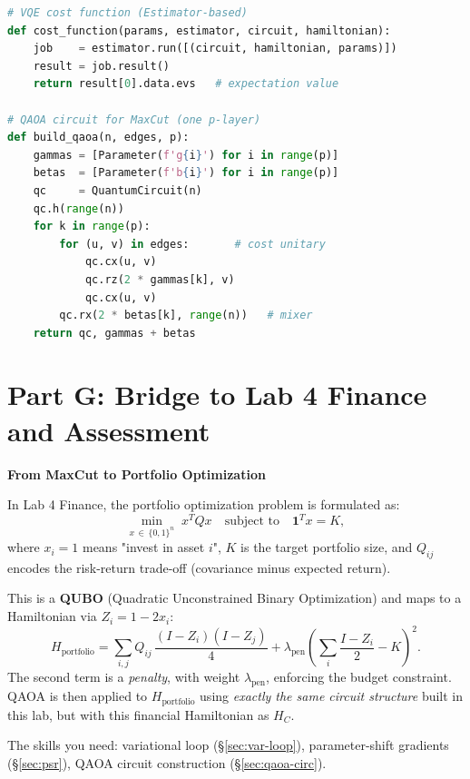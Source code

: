 \documentclass[a4paper,11pt]{article}
\begin{document}
\begin{tcolorbox}[colback=green!5!white,colframe=green!75!black,
    title=Key Code Structure, fonttitle=\bfseries]
\begin{lstlisting}[language=Python]
# VQE cost function (Estimator-based)
def cost_function(params, estimator, circuit, hamiltonian):
    job    = estimator.run([(circuit, hamiltonian, params)])
    result = job.result()
    return result[0].data.evs   # expectation value

# QAOA circuit for MaxCut (one p-layer)
def build_qaoa(n, edges, p):
    gammas = [Parameter(f'g{i}') for i in range(p)]
    betas  = [Parameter(f'b{i}') for i in range(p)]
    qc     = QuantumCircuit(n)
    qc.h(range(n))
    for k in range(p):
        for (u, v) in edges:       # cost unitary
            qc.cx(u, v)
            qc.rz(2 * gammas[k], v)
            qc.cx(u, v)
        qc.rx(2 * betas[k], range(n))   # mixer
    return qc, gammas + betas
\end{lstlisting}
\end{tcolorbox}

\section{Part G: Bridge to Lab 4 Finance and Assessment}

\begin{bridgebox}
\textbf{From MaxCut to Portfolio Optimization}

In Lab 4 Finance, the portfolio optimization problem is formulated as:
\[
    \min_{x\,\in\,\{0,1\}^n}\; x^T Q x
    \quad\text{subject to}\quad \mathbf{1}^T x = K,
\]
where $x_i = 1$ means "invest in asset $i$", $K$ is the target portfolio
size, and $Q_{ij}$ encodes the risk-return trade-off (covariance minus
expected return).

This is a \textbf{QUBO} (Quadratic Unconstrained Binary Optimization) and
maps to a Hamiltonian via $Z_i = 1 - 2x_i$:
\[
    H_{\text{portfolio}} = \sum_{i,j} Q_{ij}\,\frac{(I-Z_i)(I-Z_j)}{4}
    + \lambda_\text{pen}\!\left(\sum_i \frac{I-Z_i}{2} - K\right)^{\!2}.
\]
The second term is a \emph{penalty}, with weight $\lambda_\text{pen}$, enforcing the budget constraint.
QAOA is then applied to $H_{\text{portfolio}}$ using \emph{exactly the
same circuit structure} built in this lab, but with this financial
Hamiltonian as $H_C$.

The skills you need: variational loop (\S\ref{sec:var-loop}),
parameter-shift gradients (\S\ref{sec:psr}), QAOA circuit
construction (\S\ref{sec:qaoa-circ}).
\end{bridgebox}
\end{document}
